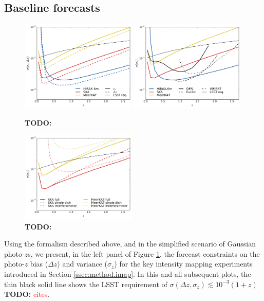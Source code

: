 \documentclass[prd,twocolumn]{revtex4}
\newcommand{\TODO}[1]{{\bf TODO:} \textcolor{red}{#1}}
\begin{document}
  \subsection{Baseline forecasts} \label{ssec:results.baseline}
    \begin{figure}
      \centering
      \includegraphics[width=0.49\textwidth]{compare_wbias}
      \includegraphics[width=0.49\textwidth]{compare_spec}
      \caption{\TODO{}}
      \label{fig:compare_spec}
    \end{figure}
    \begin{figure}
      \centering
      \includegraphics[width=0.49\textwidth]{compare_if_sd}
      \caption{\TODO{}}
      \label{fig:compare_if_sd}
    \end{figure}
    Using the formalism described above, and in the simplified scenario of Gaussian photo-$z$s,
    we present, in the left panel of Figure \ref{fig:compare_spec}, the forecast constraints on the 
    photo-$z$ bias ($\Delta z$) and variance ($\sigma_z$) for the key intensity mapping experiments
    introduced in Section \ref{ssec:method.imap}. In this and all subsequent plots, the thin black
    solid line shows the LSST requirement of $\sigma(\Delta z,\sigma_z)\lesssim10^{-3}(1+z)$
    \TODO{cites}.
    
\end{document}
